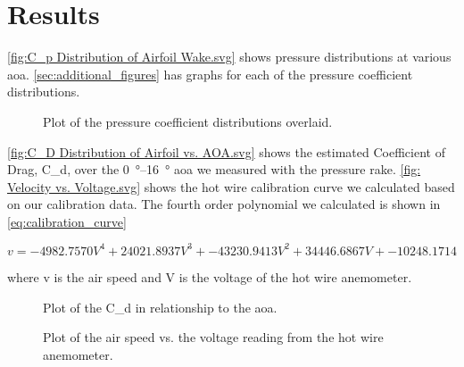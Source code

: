 \chapter{Results}
\label{cp:results}

\autoref{fig:C_p Distribution of Airfoil Wake.svg} shows pressure distributions at various \acrshort{aoa}. \autoref{sec:additional_figures} has graphs for each of the pressure coefficient distributions.

\begin{figure}[htpb]
    \centering
    
    \caption[Plot of the Consolidated Pressure distributions.]{Plot of the pressure coefficient distributions overlaid.}
    \label{fig:C_p Distribution of Airfoil Wake.svg}
\end{figure}

\autoref{fig:C_D Distribution of Airfoil vs. AOA.svg} shows the estimated Coefficient of Drag, \gls{C_d}, over the \qtyrange{0}{16}{\degree} \acrshort{aoa} we measured with the pressure rake. \autoref{fig: Velocity vs. Voltage.svg} shows the hot wire calibration curve we calculated based on our calibration data. The fourth order polynomial we calculated is shown in \autoref{eq:calibration_curve}

\begin{equation} \label{eq:calibration_curve}
    v = -4982.7570V^4 + 24021.8937V^3 + -43230.9413V^2 + 34446.6867V + -10248.1714
\end{equation}

\noindent where \gls{v} is the air speed and \gls{V} is the voltage of the hot wire anemometer.

\begin{figure}[htpb]
    \centering
    
    \caption[Plot of the \gls{C_d} in relationship to the \acrshort{aoa}.]{Plot of the \gls{C_d} in relationship to the \acrshort{aoa}.}
    \label{fig:C_D Distribution of Airfoil vs. AOA.svg}
\end{figure}

\begin{figure}[htpb]
    \centering
    
    \caption[Plot of the Velocity of the air vs the voltage of the  Hot Wire Anemometer]{Plot of the air speed vs. the voltage reading from the hot wire anemometer.}
    \label{fig: Velocity vs. Voltage.svg}
\end{figure}

